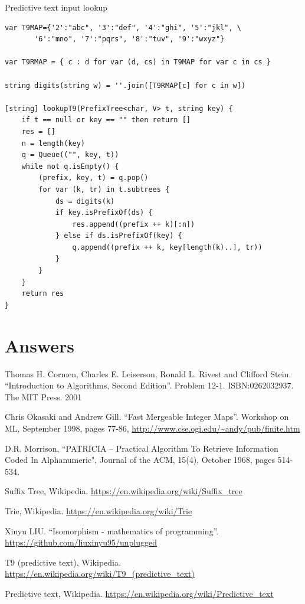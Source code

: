 \documentclass[b5paper]{article}
\begin{document}
Predictive text input lookup
\begin{lstlisting}[language = Bourbaki]
var T9MAP={'2':"abc", '3':"def", '4':"ghi", '5':"jkl", \
       '6':"mno", '7':"pqrs", '8':"tuv", '9':"wxyz"}

var T9RMAP = { c : d for var (d, cs) in T9MAP for var c in cs }

string digits(string w) = ''.join([T9RMAP[c] for c in w])

[string] lookupT9(PrefixTree<char, V> t, string key) {
    if t == null or key == "" then return []
    res = []
    n = length(key)
    q = Queue(("", key, t))
    while not q.isEmpty() {
        (prefix, key, t) = q.pop()
        for var (k, tr) in t.subtrees {
            ds = digits(k)
            if key.isPrefixOf(ds) {
                res.append((prefix ++ k)[:n])
            } else if ds.isPrefixOf(key) {
                q.append((prefix ++ k, key[length(k)..], tr))
            }
        }
    }
    return res
}
\end{lstlisting}

\ifx\wholebook\relax \else
\section{Answers}
\shipoutAnswer

\begin{thebibliography}{99}

Thomas H. Cormen, Charles E. Leiserson, Ronald L. Rivest and Clifford Stein.
``Introduction to Algorithms, Second Edition''. Problem 12-1. ISBN:0262032937. The MIT Press. 2001

Chris Okasaki and Andrew Gill. ``Fast Mergeable Integer
Maps''. Workshop on ML, September 1998, pages 77-86, \url{http://www.cse.ogi.edu/~andy/pub/finite.htm}

D.R. Morrison, ``PATRICIA -- Practical Algorithm To Retrieve  Information Coded In Alphanumeric", Journal of the ACM, 15(4), October 1968, pages 514-534.

Suffix Tree, Wikipedia. \url{https://en.wikipedia.org/wiki/Suffix_tree}

Trie, Wikipedia. \url{https://en.wikipedia.org/wiki/Trie}

Xinyu LIU. ``Isomorphism - mathematics of programming''. \url{https://github.com/liuxinyu95/unplugged}

T9 (predictive text), Wikipedia. \url{https://en.wikipedia.org/wiki/T9_(predictive_text)}

Predictive text,
Wikipedia. \url{https://en.wikipedia.org/wiki/Predictive_text}

\end{thebibliography}

\expandafter\enddocument
\fi
\end{document}
